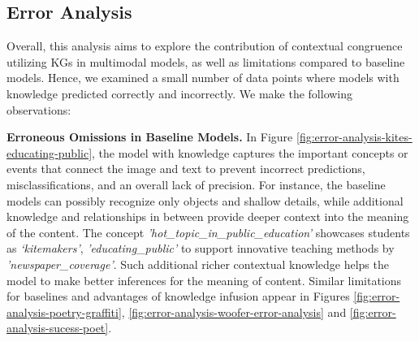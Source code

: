 \subsection{Error Analysis}
\vspace{-1mm}
Overall, this analysis aims to explore the contribution of contextual congruence utilizing KGs in multimodal models, as well as limitations compared to baseline models. Hence, we examined a small number of data points where models with knowledge predicted correctly and incorrectly. We make the following observations:

\noindent \textbf{Erroneous Omissions in Baseline Models.}  In Figure \ref{fig:error-analysis-kites-educating-public}, %
the model with knowledge captures the important concepts or events that connect the image and text to prevent incorrect predictions, misclassifications, and an overall lack of precision. For instance, the baseline models can possibly recognize only objects and shallow details, while additional knowledge and relationships in between provide deeper context into the meaning of the content. The concept \textit{'hot\_topic\_in\_public\_education'} showcases students as \textit{‘kitemakers’}, \textit{'educating\_public'}  to support innovative teaching methods by \textit{'newspaper\_coverage'}. Such additional richer contextual knowledge helps the model to make better inferences for the meaning of content. 
Similar limitations for baselines and advantages of knowledge infusion appear in  Figures \ref{fig:error-analysis-poetry-graffiti}, \ref{fig:error-analysis-woofer-error-analysis} and \ref{fig:error-analysis-sucess-poet}. 

